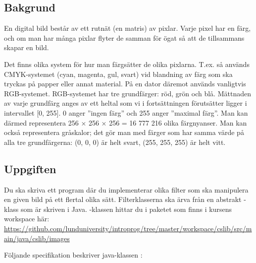 

\subsection{Bakgrund}

En digital bild består av ett rutnät (en matris) av pixlar. Varje pixel har en färg, och om man har många pixlar flyter de samman för ögat så att de tillsammans skapar en bild.

Det finns olika system för hur man färgsätter de olika pixlarna. T.ex. så används CMYK-systemet (cyan, magenta, gul, svart) vid blandning av färg som ska tryckas på papper eller annat material. På en dator däremot används vanligtvis RGB-systemet. RGB-systemet har tre grundfärger: röd, grön och blå. Mättnaden av varje grundfärg anges av ett heltal som vi i fortsättningen förutsätter ligger i intervallet [0, 255]. 0 anger ”ingen färg” och 255 anger ”maximal färg”. Man kan därmed representera 256 × 256 × 256 = 16 777 216 olika färgnyanser. Man kan också representera gråskalor; det gör man med färger som har samma värde på alla tre grundfärgerna: (0, 0, 0) är helt svart, (255, 255, 255) är helt vitt.


\subsection{Uppgiften}
Du ska skriva ett program där du implementerar olika filter som ska manipulera en given bild på ett flertal olika sätt. Filterklasserna ska ärva från en abstrakt -klass som är skriven i Java. -klassen hittar du i paketet  som finns i kursens workspace här:
\url{https://github.com/lunduniversity/introprog/tree/master/workspace/cslib/src/main/java/cslib/images}

Följande specifikation beskriver java-klassen :

